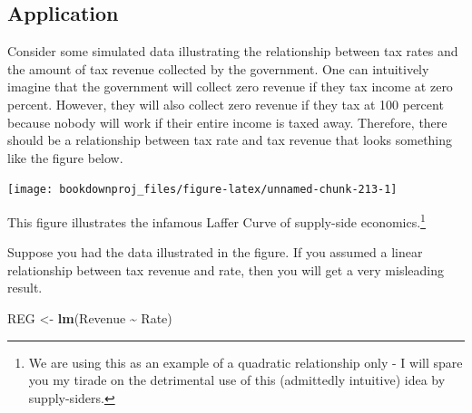 \documentclass[
]{book}
\newenvironment{Shaded}{\begin{snugshade}}{\end{snugshade}}
\newcommand{\FunctionTok}[1]{\textcolor[rgb]{0.13,0.29,0.53}{\textbf{#1}}}
\newcommand{\NormalTok}[1]{#1}
\newcommand{\OtherTok}[1]{\textcolor[rgb]{0.56,0.35,0.01}{#1}}
\newcommand{\SpecialCharTok}[1]{\textcolor[rgb]{0.81,0.36,0.00}{\textbf{#1}}}
\begin{document}
\subsection*{Application}\label{application-5}

Consider some simulated data illustrating the relationship between tax rates and the amount of tax revenue collected by the government. One can intuitively imagine that the government will collect zero revenue if they tax income at zero percent. However, they will also collect zero revenue if they tax at 100 percent because nobody will work if their entire income is taxed away. Therefore, there should be a relationship between tax rate and tax revenue that looks something like the figure below.

\begin{center}\texttt{[image: bookdownproj\_files/figure-latex/unnamed-chunk-213-1]} \end{center}

This figure illustrates the infamous Laffer Curve of supply-side economics.\footnote{We are using this as an example of a quadratic relationship only - I will spare you my tirade on the detrimental use of this (admittedly intuitive) idea by supply-siders.}

Suppose you had the data illustrated in the figure. If you assumed a linear relationship between tax revenue and rate, then you will get a very misleading result.

\begin{Shaded}
\begin{Highlighting}[]
\NormalTok{REG }\OtherTok{\textless{}{-}} \FunctionTok{lm}\NormalTok{(Revenue }\SpecialCharTok{\textasciitilde{}}\NormalTok{ Rate)}
\end{Highlighting}
\end{Shaded}
\end{document}
